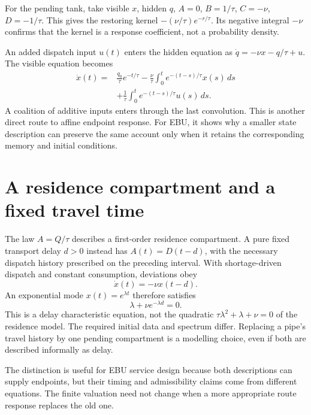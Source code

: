 For the pending tank, take visible $x$, hidden $q$, $A=0$, $B=1/\tau$, $C=-\nu$, $D=-1/\tau$. This gives the restoring kernel $-(\nu/\tau)e^{-r/\tau}$. Its negative integral $-\nu$ confirms that the kernel is a response coefficient, not a probability density.

An added dispatch input $u(t)$ enters the hidden equation as
$\dot q=-\nu x-q/\tau+u$. The visible equation becomes
\begin{align}\label{eq:forced-tank-memory}
 \dot x(t)={}&\frac{q_0}{\tau}e^{-t/\tau}
 -\frac{\nu}{\tau}\int_0^t e^{-(t-s)/\tau}x(s)\,ds\nonumber\\
 &+\frac1\tau\int_0^t e^{-(t-s)/\tau}u(s)\,ds.
\end{align}
A coalition of additive inputs enters through the last convolution. This is another direct route to affine endpoint response. For EBU, it shows why a smaller state description can preserve the same account only when it retains the corresponding memory and initial conditions.

\section{A residence compartment and a fixed travel time}
The law $A=Q/\tau$ describes a first-order residence compartment. A pure fixed transport delay $d>0$ instead has $A(t)=D(t-d)$, with the necessary dispatch history prescribed on the preceding interval. With shortage-driven dispatch and constant consumption, deviations obey
\begin{equation}
 \dot x(t)=-\nu x(t-d).
\end{equation}
An exponential mode $x(t)=e^{\lambda t}$ therefore satisfies
\begin{equation}
 \lambda+\nu e^{-\lambda d}=0.
\end{equation}
This is a delay characteristic equation, not the quadratic $\tau\lambda^2+\lambda+\nu=0$ of the residence model. The required initial data and spectrum differ. Replacing a pipe's travel history by one pending compartment is a modelling choice, even if both are described informally as delay.

The distinction is useful for EBU service design because both descriptions can supply endpoints, but their timing and admissibility claims come from different equations. The finite valuation need not change when a more appropriate route response replaces the old one.

